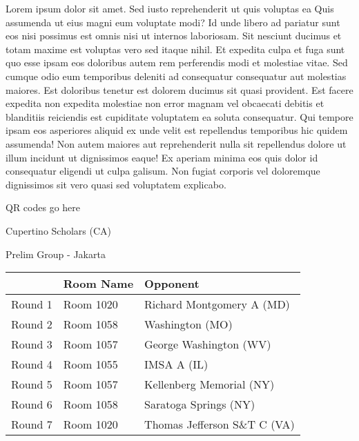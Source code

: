 \documentclass{article}%
\begin{document}
\vspace*{8pt}%
\linebreak%
\newline%
\newline%
Lorem ipsum dolor sit amet. Sed iusto reprehenderit ut quis voluptas ea Quis assumenda ut eius magni eum voluptate modi? Id unde libero ad pariatur sunt eos nisi possimus est omnis nisi ut internos laboriosam. Sit nesciunt ducimus et totam maxime est voluptas vero sed itaque nihil. Et expedita culpa et fuga sunt quo esse ipsam eos doloribus autem rem perferendis modi et molestiae vitae.\newline%
\newline%
Sed cumque odio eum temporibus deleniti ad consequatur consequatur aut molestias maiores. Est doloribus tenetur est dolorem ducimus sit quasi provident. Est facere expedita non expedita molestiae non error magnam vel obcaecati debitis et blanditiis reiciendis est cupiditate voluptatem ea soluta consequatur. Qui tempore ipsam eos asperiores aliquid ex unde velit est repellendus temporibus hic quidem assumenda!\newline%
\newline%
Non autem maiores aut reprehenderit nulla sit repellendus dolore ut illum incidunt ut dignissimos eaque! Ex aperiam minima eos quis dolor id consequatur eligendi ut culpa galisum. Non fugiat corporis vel doloremque dignissimos sit vero quasi sed voluptatem explicabo.\newline%
\newline%
%
\vspace*{30pt}%
\begin{center}%
\begin{Huge}%
QR codes go here%
\end{Huge}%
\end{center}%
\newpage%
%
\begin{center}%
\begin{Huge}%
Cupertino Scholars (CA)%
\end{Huge}%
\vspace*{8pt}%
\linebreak%
\begin{Large}%
Prelim Group {-} Jakarta%
\end{Large}%
\end{center}%
\begin{tabularx}{\textwidth}{|c|Y|Y|}%
\hline%
&Room Name&Opponent\\%
\hline%
Round 1&Room 1020&Richard Montgomery A (MD)\\%
Round 2&Room 1058&Washington (MO)\\%
Round 3&Room 1057&George Washington (WV)\\%
Round 4&Room 1055&IMSA A (IL)\\%
Round 5&Room 1057&Kellenberg Memorial (NY)\\%
Round 6&Room 1058&Saratoga Springs (NY)\\%
Round 7&Room 1020&Thomas Jefferson S\&T C (VA)\\%
\hline%
\end{tabularx}%
\end{document}

